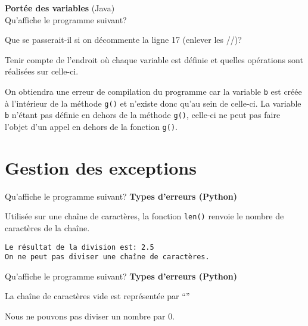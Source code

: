  \begin{Exercice}[10 minutes] \textbf{Portée des variables} (Java) \\
    Qu'affiche le programme suivant?
    
    Que se passerait-il si on décommente la ligne 17 (enlever les //)?

    \begin{conseil}
        Tenir compte de l’endroit où chaque variable est définie et quelles opérations sont réalisées sur celle-ci.
    \end{conseil}

    \begin{solution}
        On obtiendra une erreur de compilation du programme car la variable \lstinline{b} est créée à l’intérieur de la méthode \lstinline{g()} et n’existe donc qu’au sein de celle-ci. La variable \lstinline{b} n’étant pas définie en dehors de la méthode \lstinline{g()}, celle-ci ne peut pas faire l’objet d’un appel en dehors de la fonction \lstinline{g()}.
    \end{solution}
 \end{Exercice}


\section{Gestion des exceptions}

\begin{Exercice}[5 minutes] Qu'affiche le programme suivant? \textbf{Types d'erreurs (Python)}\\
      
     \begin{conseil}
        Utilisée sur une chaîne de caractères, la fonction \lstinline{len()} renvoie le nombre de caractères de la chaîne. 
    \end{conseil}
     \begin{solution}
        \lstinline{Le résultat de la division est: 2.5}\\
        \lstinline{On ne peut pas diviser une chaîne de caractères.}
     \end{solution}   
 \end{Exercice}

\begin{Exercice}[5 minutes] Qu'affiche le programme suivant? \textbf{Types d'erreurs (Python)}\\
    
    
     \begin{conseil}
         La chaîne de caractères vide est représentée par ``'' 
    \end{conseil}
     \begin{solution}
        Nous ne pouvons pas diviser un nombre par 0.
     \end{solution}   
 \end{Exercice}

